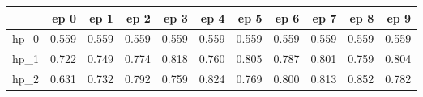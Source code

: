 \begin{tabular}{lrrrrrrrrrr}
\toprule
{} &   ep 0 &   ep 1 &   ep 2 &   ep 3 &   ep 4 &   ep 5 &   ep 6 &   ep 7 &   ep 8 &   ep 9 \\
\midrule
hp\_0 &  0.559 &  0.559 &  0.559 &  0.559 &  0.559 &  0.559 &  0.559 &  0.559 &  0.559 &  0.559 \\
hp\_1 &  0.722 &  0.749 &  0.774 &  0.818 &  0.760 &  0.805 &  0.787 &  0.801 &  0.759 &  0.804 \\
hp\_2 &  0.631 &  0.732 &  0.792 &  0.759 &  0.824 &  0.769 &  0.800 &  0.813 &  0.852 &  0.782 \\
\bottomrule
\end{tabular}
